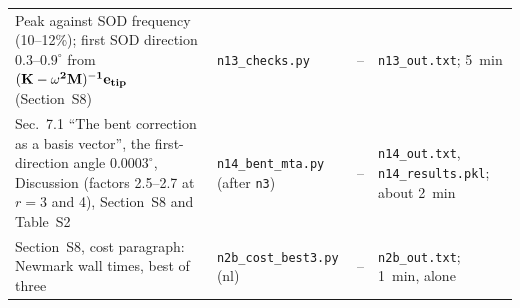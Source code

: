 \documentclass[10pt]{article}
\newcommand{\f}[1]{\texttt{#1}}
\begin{document}
\begin{longtable}{L{0.31\textwidth}L{0.25\textwidth}L{0.08\textwidth}L{0.25\textwidth}}
Peak against SOD frequency (10--12\%); first SOD direction $0.3$--$0.9^\circ$ from $(\bf K-\omega^2 M)^{-1}e_{tip}$ (Section~S8) & \f{n13\_\allowbreak{}checks.py} & -- & \f{n13\_\allowbreak{}out.txt}; 5~min\\
Sec.~7.1 ``The bent correction as a basis vector'', the first-direction angle $0.0003^\circ$, Discussion (factors 2.5--2.7 at $r=3$ and 4), Section~S8 and Table~S2 & \f{n14\_\allowbreak{}bent\_\allowbreak{}mta.py} (after \f{n3}) & -- & \f{n14\_\allowbreak{}out.txt}, \f{n14\_\allowbreak{}results.pkl}; about 2~min\\
Section~S8, cost paragraph: Newmark wall times, best of three & \f{n2b\_\allowbreak{}cost\_\allowbreak{}best3.py} (nl) & -- & \f{n2b\_\allowbreak{}out.txt}; 1~min, alone\\
\bottomrule
\end{longtable}
\end{document}
